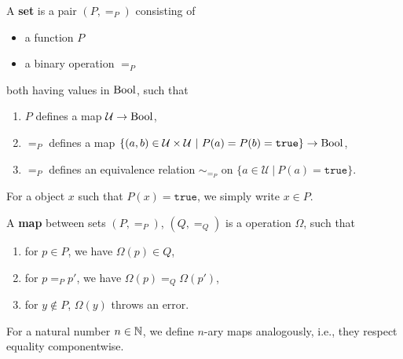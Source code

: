 \begin{definition}
 A \textbf{\GAP set} is a pair $(P, =_P)$ consisting of
 \begin{itemize}
  \item a \GAP function $P$
  \item a binary \GAP operation $=_P$
 \end{itemize}
both having values in $\mathrm{Bool}$, such that
\begin{enumerate}
 \item $P$ defines a map $\mathcal{U} \rightarrow \mathrm{Bool}$,
 \item $=_P$ defines a map $\{ ( a,b ) \in \mathcal{U} \times \mathcal{U} ~|~ P(a) = P(b) = \texttt{true} \} \rightarrow \mathrm{Bool}$,
 \item $=_P$ defines an equivalence relation $\sim_{=_P}$ on $\{ a \in \mathcal{U} ~|~ P(a) = \texttt{true} \}$.
\end{enumerate}
\end{definition}

\begin{notation}
 For a \GAP object $x$ such that $P(x) = \texttt{true}$, we simply write $x \in P$.
\end{notation}

\begin{definition}
 A \textbf{\GAP map} between \GAP sets $(P, =_P)$, $(Q, =_Q)$ is a \GAP operation $\Omega$, such that
 \begin{enumerate}
  \item for $p \in P$, we have $\Omega( p ) \in Q$,
  \item for $p =_P p'$, we have $\Omega( p ) =_Q \Omega( p')$,
  \item for $y \not\in P$, $\Omega( y )$ throws an error.
 \end{enumerate}
 For a natural number $n \in \mathbb{N}$, we define $n$-ary \GAP maps analogously, i.e., 
 they respect equality componentwise.
\end{definition}


